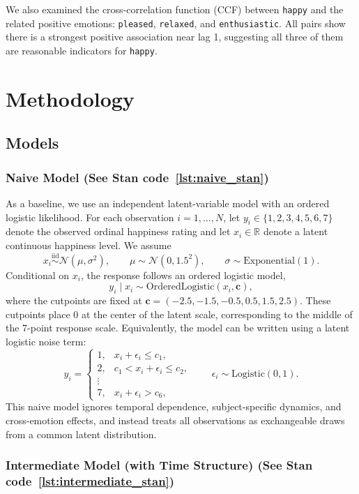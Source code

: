 \documentclass[12pt,letterpaper,fleqn]{article}
\begin{document}
We also examined the cross-correlation function (CCF) between \texttt{happy} and the related positive emotions: \texttt{pleased}, \texttt{relaxed}, and \texttt{enthusiastic}. All pairs show there is a strongest positive association near lag 1, suggesting all three of them are reasonable indicators for \texttt{happy}. 


\section{Methodology}
\subsection{Models}
\subsubsection{Naive Model (See Stan code~\ref{lst:naive_stan})}

As a baseline, we use an independent latent-variable model with an ordered logistic likelihood. For each observation \(i=1,\dots,N\), let \(y_i \in \{1,2,3,4,5,6,7\}\) denote the observed ordinal happiness rating and let \(x_i \in \mathbb{R}\) denote a latent continuous happiness level. We assume
\[
x_i \overset{\mathrm{iid}}{\sim} \mathcal{N}(\mu,\sigma^2),
\qquad 
\mu \sim \mathcal{N}(0,1.5^2),
\qquad
\sigma \sim \mathrm{Exponential}(1).
\]
Conditional on \(x_i\), the response follows an ordered logistic model,
\[
y_i \mid x_i \sim \mathrm{OrderedLogistic}(x_i,\mathbf{c}),
\]
where the cutpoints are fixed at $\mathbf{c}=(-2.5,-1.5,-0.5,0.5,1.5,2.5)$.
These cutpoints place \(0\) at the center of the latent scale, corresponding to the middle of the 7-point response scale. Equivalently, the model can be written using a latent logistic noise term:
\[
y_i =
\begin{cases}
1, & x_i+\epsilon_i \le c_1,\\
2, & c_1 < x_i+\epsilon_i \le c_2,\\
\vdots \\
7, & x_i+\epsilon_i > c_6,
\end{cases}
\qquad
\epsilon_i \sim \mathrm{Logistic}(0,1).
\]
This naive model ignores temporal dependence, subject-specific dynamics, and cross-emotion effects, and instead treats all observations as exchangeable draws from a common latent distribution.

\subsubsection{Intermediate Model (with Time Structure)  (See Stan code~\ref{lst:intermediate_stan})}
\end{document}
